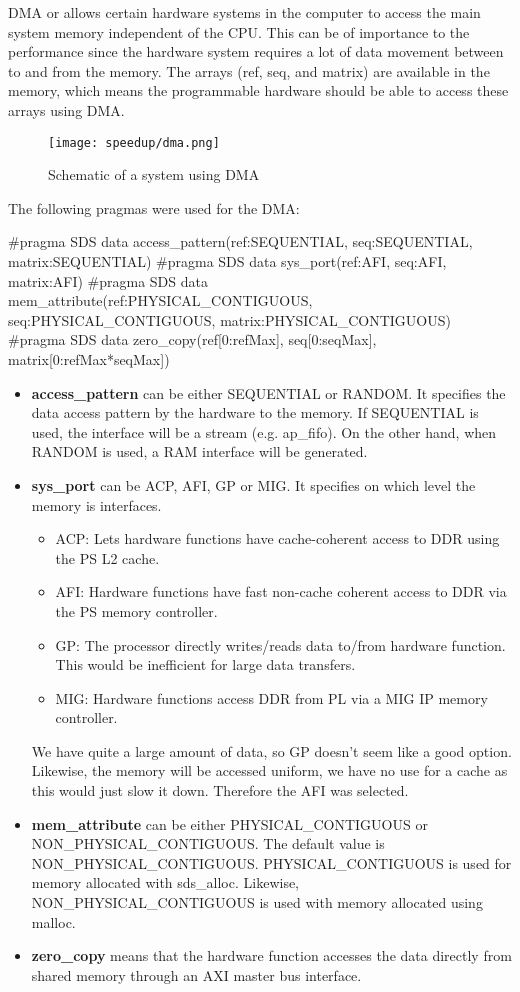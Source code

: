 DMA or  allows certain hardware systems in the computer to access the main system memory independent of the CPU. This can be of importance to the performance since the hardware system requires a lot of data movement between to and from the memory. The arrays (ref, seq, and matrix) are available in the memory, which means the programmable hardware should be able to access these arrays using DMA. 

\begin{figure}[H]
	\centering
	\texttt{[image: speedup/dma.png]}
	\caption{Schematic of a system using DMA}
	\label{fig:DMA}
\end{figure}

The following pragmas were used for the DMA:
\begin{lcverbatim}
#pragma SDS data access_pattern(ref:SEQUENTIAL, seq:SEQUENTIAL, 
	matrix:SEQUENTIAL)
#pragma SDS data sys_port(ref:AFI, seq:AFI, matrix:AFI)
#pragma SDS data mem_attribute(ref:PHYSICAL_CONTIGUOUS, 
	seq:PHYSICAL_CONTIGUOUS, matrix:PHYSICAL_CONTIGUOUS)
#pragma SDS data zero_copy(ref[0:refMax], seq[0:seqMax], 
	matrix[0:refMax*seqMax])
\end{lcverbatim}
\begin{itemize}
	\item \textbf{access\_pattern} can be either SEQUENTIAL or RANDOM. It specifies the data access pattern by the hardware to the memory. If SEQUENTIAL is used, the interface will be a stream (e.g. ap\_fifo). On the other hand, when RANDOM is used, a RAM interface will be generated.
	\item \textbf{sys\_port} can be ACP, AFI, GP or MIG. It specifies on which level the memory is interfaces. 
	\begin{itemize}
		\item ACP: Lets hardware functions have cache-coherent access to DDR using the PS L2 cache.
		\item AFI: Hardware functions have fast non-cache coherent access to DDR via the PS memory controller.
		\item GP: The processor directly writes/reads data to/from hardware function. This would be inefficient for large data transfers.
		\item MIG: Hardware functions access DDR from PL via a MIG IP memory controller.
	\end{itemize}
	We have quite a large amount of data, so GP doesn't seem like a good option. Likewise, the memory will be accessed uniform, we have no use for a cache as this would just slow it down. Therefore the AFI was selected.
	\item \textbf{mem\_attribute} can be either PHYSICAL\_CONTIGUOUS or NON\_PHYSICAL\_CONTIGUOUS. The default value is NON\_PHYSICAL\_CONTIGUOUS. PHYSICAL\_CONTIGUOUS is used for memory allocated with sds\_alloc. Likewise, NON\_PHYSICAL\_CONTIGUOUS is used with memory allocated using malloc.
	\item \textbf{zero\_copy} means that the hardware function accesses the data directly from shared memory through an AXI master bus interface.
\end{itemize}


